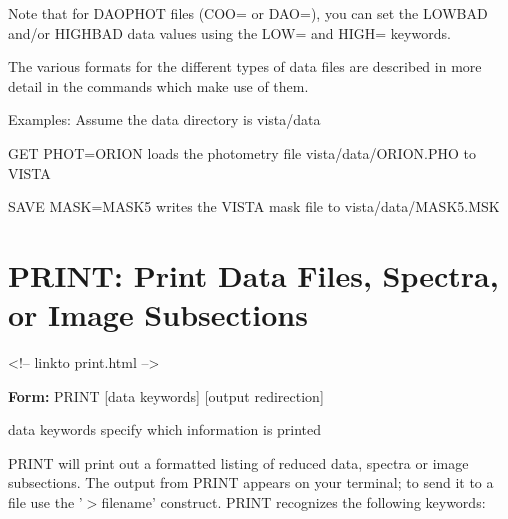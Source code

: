 Note that for DAOPHOT files (COO= or DAO=), you can set the LOWBAD and/or
HIGHBAD data values using the LOW= and HIGH= keywords.

The various formats for the different types of data files are described in
more detail in the commands which make use of them.

Examples:  Assume the data directory is vista/data
\begin{example}
  \item[GET PHOT=ORION\hfill]{loads the photometry file
       vista/data/ORION.PHO to VISTA}
  \item[SAVE MASK=MASK5\hfill]{writes the VISTA mask file
       to vista/data/MASK5.MSK}
\end{example}


\section{PRINT: Print Data Files, Spectra, or Image Subsections}
\begin{rawhtml}
<!-- linkto print.html -->
\end{rawhtml}
\begin{command}
  \item[\textbf{Form: } PRINT {[data keywords]} {[output redirection]}\hfill]
  \item[data keywords]{specify which information is printed}
\end{command}

PRINT will print out a formatted listing of reduced data, spectra or image
subsections.  The output from PRINT appears on your terminal; to send it to
a file use the '$>$filename' construct.  PRINT recognizes the following
keywords:

